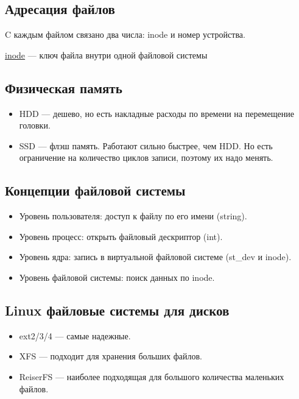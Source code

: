 \subsection{Адресация файлов}

C каждым файлом связано два числа: inode и номер устройства.
\begin{Def}
	\underline{inode} --- ключ файла внутри одной файловой системы
\end{Def}

\subsection{Физическая память}

\begin{itemize}
	\item HDD --- дешево, но есть накладные расходы по времени на перемещение головки.
	\item SSD --- флэш память. Работают сильно быстрее, чем HDD. Но есть ограничение на 
	количество циклов записи, поэтому их надо менять.
\end{itemize}


\subsection{Концепции файловой системы}

\begin{itemize}
	\item Уровень пользователя: доступ к файлу по его имени (string).
	\item Уровень процесс: открыть файловый дескриптор (int).
	\item Уровень ядра: запись в виртуальной файловой системе (st\_dev и inode).
	\item Уровень файловой системы: поиск данных по inode.
\end{itemize}

\subsection{Linux файловые системы для дисков}

\begin{itemize}
	\item ext2/3/4 --- самые надежные.
	\item XFS --- подходит для хранения больших файлов.
	\item ReiserFS --- наиболее подходящая для большого количества маленьких файлов.
\end{itemize}


